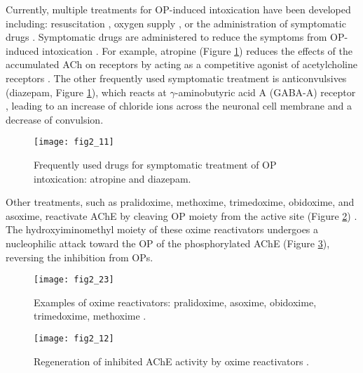 \begin{refsection}
Currently, multiple treatments for OP-induced intoxication have been developed
\cite{Colovic2013b} including: resuscitation \cite{MahdiBalaliMood2012}, oxygen
supply \cite{MahdiBalaliMood2012}, or the administration of symptomatic drugs
\cite{Colovic2013b,Robenshtok2002,Marrs2003}. Symptomatic drugs are
administered to reduce the symptoms from  OP-induced intoxication
\cite{Colovic2013b}. For example, atropine (Figure \ref{fig:op-drug}) reduces
the effects of the accumulated ACh on receptors by acting as a competitive
agonist of acetylcholine receptors \cite{Colovic2013b,Robenshtok2002}. The
other frequently used symptomatic treatment is anticonvulsives (diazepam,
Figure \ref{fig:op-drug}), which reacts at $\gamma$-aminobutyric acid A
(GABA-A) receptor \cite{Marrs2003}, leading to an increase of chloride ions
across the neuronal cell membrane and a decrease of convulsion. 
\begin{figure}[htbp] \centering \texttt{[image: fig2\_11]}
    \caption[Frequently used drugs for symptomatic treatment of OP
    intoxication: atropine and diazepam.]{Frequently used drugs for symptomatic
    treatment of OP intoxication: atropine and diazepam.} \label{fig:op-drug}
\end{figure}

Other treatments, such as pralidoxime, methoxime, trimedoxime, obidoxime, and
asoxime, reactivate AChE by cleaving OP moiety from the active site (Figure
\ref{fig:oxime-exapmle}) \cite{Colovic2013b}. The hydroxyiminomethyl moiety of
these oxime reactivators undergoes a nucleophilic attack toward the OP of the
phosphorylated AChE (Figure \ref{fig:oxime}), reversing the inhibition from
OPs.
\begin{figure}[htbp] \centering \texttt{[image: fig2\_23]}
    \caption[Examples of oxime reactivators: pralidoxime, asoxime, obidoxime,
    trimedoxime, methoxime.]{Examples of oxime reactivators: pralidoxime,
        asoxime, obidoxime, trimedoxime, methoxime \cite{Colovic2013b}.}
        \label{fig:oxime-exapmle}
\end{figure}
\begin{figure}[htbp] \centering \texttt{[image: fig2\_12]}
    \caption[Regeneration of inhibited AChE activity by oxime
    reactivators.]{Regeneration of inhibited AChE activity by oxime
        reactivators \cite{Colovic2013b}.}
        \label{fig:oxime}
\end{figure}


\end{refsection}
